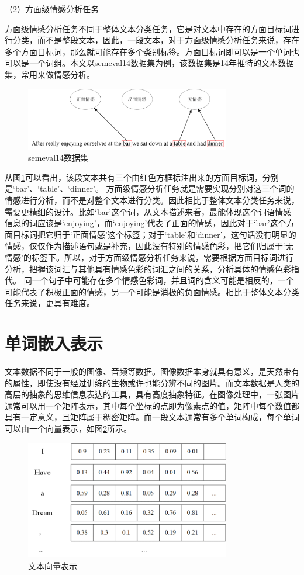 （2）方面级情感分析任务

方面级情感分析任务不同于整体文本分类任务，它是对文本中存在的方面目标词进行分类，而不是整段文本，因此，一段文本，对于方面级情感分析任务来说，存在多个方面目标词，那么就可能存在多个类别标签。方面目标词即可以是一个单词也可以是一个词组。本文以semeval14数据集为例，该数据集是14年推特的文本数据集，常用来做情感分析。
\begin{figure}[htb]%
	\setlength{\belowcaptionskip}{0pt}
	\centering
	\includegraphics[width=0.8\textwidth]{pic/2-2.png}
	\caption{semeval14数据集}
	\label{semeval14datasets}
\end{figure}

从图\ref{semeval14datasets}可以看出，该段文本共有三个由红色方框标注出来的方面目标词，分别是‘bar’、‘table’、‘dinner’。
方面级情感分析任务就是需要实现分别对这三个词的情感进行分析，而不是对整个文本进行分类。因此相比于整体文本分类任务来说，需要更精细的设计。比如‘bar’这个词，从文本描述来看，最能体现这个词语情感信息的词应该是‘enjoying’，而‘enjoying’代表了正面的情感，因此对于‘bar’这个方面目标词把它归于‘正面情感’这个标签；对于‘table’和‘dinner’，这句话没有明显的情感，仅仅作为描述语句或是补充，因此没有特别的情感色彩，把它们归属于‘无情感’的标签下。所以，对于方面级情感分析任务来说，需要根据方面目标词进行分析，把握该词汇与其他具有情感色彩的词汇之间的关系，分析具体的情感色彩指代。
同一个句子中可能存在多个情感色彩词，并且词的含义可能是相反的，一个可能代表了积极正面的情感，另一个可能是消极的负面情感。相比于整体文本分类任务来说，更具有难度。
\section{单词嵌入表示}
文本数据不同于一般的图像、音频等数据。图像数据本身就具有意义，是天然带有的属性，即使没有经过训练的生物或许也能分辨不同的图片。而文本数据是人类的高层的抽象的思维信息表达的工具，具有高度抽象特征。在图像处理中，一张图片通常可以用一个矩阵表示，其中每个坐标的点即为像素点的值，矩阵中每个数值都具有一定意义，且矩阵属于稠密矩阵。而一段文本通常有多个单词构成，每个单词可以由一个向量表示，如图\ref{textEmb}所示。
\begin{figure}[htb]%
	\setlength{\belowcaptionskip}{0pt}
	\centering
	\includegraphics[width=0.8\textwidth]{pic/2-3.png}
	\caption{文本向量表示}
	\label{textEmb}
\end{figure}

